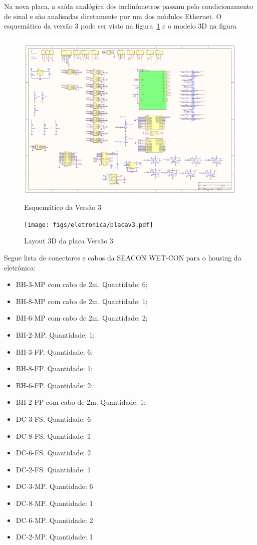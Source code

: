 Na nova placa, a saída analógica dos inclinômetros passam pelo condicionamento
de sinal e são analisadas diretamente por um dos módulos Ethernet. O esquemático
da versão 3 pode ser visto na figura~\ref{esquematicov3} e o modelo 3D na
figura 

\begin{figure}[H]
\centering
\includegraphics[width=1\columnwidth]{figs/eletronica/esquematicov3.pdf}
\caption{Esquemático da Versão 3}
\label{esquematicov3}
\end{figure}

\begin{figure}[H]
\centering
\texttt{[image: figs/eletronica/placav3.pdf]}
\caption{Layout 3D da placa Versão 3}
\label{placav3}
\end{figure}

Segue lista de conectores e cabos da SEACON WET-CON para o housing da
eletrônica:
\begin{itemize}
  \item BH-3-MP com cabo de 2m. Quantidade: 6;
  \item BH-8-MP com cabo de 2m. Quantidade: 1;
  \item BH-6-MP com cabo de 2m. Quantidade: 2;
  \item BH-2-MP. Quantidade: 1;
  \item BH-3-FP. Quantidade: 6;
  \item BH-8-FP. Quantidade: 1;
  \item BH-6-FP. Quantidade: 2;
  \item BH-2-FP com cabo de 2m. Quantidade: 1;
  \item DC-3-FS. Quantidade: 6
\item DC-8-FS. Quantidade: 1	
\item DC-6-FS. Quantidade: 2
\item DC-2-FS. Quantidade: 1
\item DC-3-MP. Quantidade: 6
\item DC-8-MP. Quantidade: 1
\item DC-6-MP. Quantidade: 2
\item DC-2-MP. Quantidade: 1   
\end{itemize}

